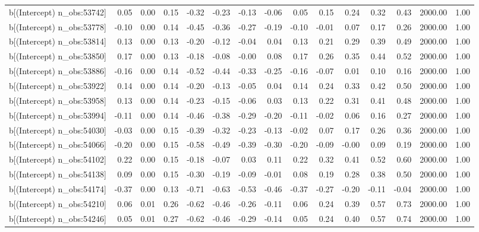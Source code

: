 \begin{table}[ht]
\begin{tabular}{rrrrrrrrrrrrrrr}
  b[(Intercept) n\_obs:53742] & 0.05 & 0.00 & 0.15 & -0.32 & -0.23 & -0.13 & -0.06 & 0.05 & 0.15 & 0.24 & 0.32 & 0.43 & 2000.00 & 1.00 \\ 
  b[(Intercept) n\_obs:53778] & -0.10 & 0.00 & 0.14 & -0.45 & -0.36 & -0.27 & -0.19 & -0.10 & -0.01 & 0.07 & 0.17 & 0.26 & 2000.00 & 1.00 \\ 
  b[(Intercept) n\_obs:53814] & 0.13 & 0.00 & 0.13 & -0.20 & -0.12 & -0.04 & 0.04 & 0.13 & 0.21 & 0.29 & 0.39 & 0.49 & 2000.00 & 1.00 \\ 
  b[(Intercept) n\_obs:53850] & 0.17 & 0.00 & 0.13 & -0.18 & -0.08 & -0.00 & 0.08 & 0.17 & 0.26 & 0.35 & 0.44 & 0.52 & 2000.00 & 1.00 \\ 
  b[(Intercept) n\_obs:53886] & -0.16 & 0.00 & 0.14 & -0.52 & -0.44 & -0.33 & -0.25 & -0.16 & -0.07 & 0.01 & 0.10 & 0.16 & 2000.00 & 1.00 \\ 
  b[(Intercept) n\_obs:53922] & 0.14 & 0.00 & 0.14 & -0.20 & -0.13 & -0.05 & 0.04 & 0.14 & 0.24 & 0.33 & 0.42 & 0.50 & 2000.00 & 1.00 \\ 
  b[(Intercept) n\_obs:53958] & 0.13 & 0.00 & 0.14 & -0.23 & -0.15 & -0.06 & 0.03 & 0.13 & 0.22 & 0.31 & 0.41 & 0.48 & 2000.00 & 1.00 \\ 
  b[(Intercept) n\_obs:53994] & -0.11 & 0.00 & 0.14 & -0.46 & -0.38 & -0.29 & -0.20 & -0.11 & -0.02 & 0.06 & 0.16 & 0.27 & 2000.00 & 1.00 \\ 
  b[(Intercept) n\_obs:54030] & -0.03 & 0.00 & 0.15 & -0.39 & -0.32 & -0.23 & -0.13 & -0.02 & 0.07 & 0.17 & 0.26 & 0.36 & 2000.00 & 1.00 \\ 
  b[(Intercept) n\_obs:54066] & -0.20 & 0.00 & 0.15 & -0.58 & -0.49 & -0.39 & -0.30 & -0.20 & -0.09 & -0.00 & 0.09 & 0.19 & 2000.00 & 1.00 \\ 
  b[(Intercept) n\_obs:54102] & 0.22 & 0.00 & 0.15 & -0.18 & -0.07 & 0.03 & 0.11 & 0.22 & 0.32 & 0.41 & 0.52 & 0.60 & 2000.00 & 1.00 \\ 
  b[(Intercept) n\_obs:54138] & 0.09 & 0.00 & 0.15 & -0.30 & -0.19 & -0.09 & -0.01 & 0.08 & 0.19 & 0.28 & 0.38 & 0.50 & 2000.00 & 1.00 \\ 
  b[(Intercept) n\_obs:54174] & -0.37 & 0.00 & 0.13 & -0.71 & -0.63 & -0.53 & -0.46 & -0.37 & -0.27 & -0.20 & -0.11 & -0.04 & 2000.00 & 1.00 \\ 
  b[(Intercept) n\_obs:54210] & 0.06 & 0.01 & 0.26 & -0.62 & -0.46 & -0.26 & -0.11 & 0.06 & 0.24 & 0.39 & 0.57 & 0.73 & 2000.00 & 1.00 \\ 
  b[(Intercept) n\_obs:54246] & 0.05 & 0.01 & 0.27 & -0.62 & -0.46 & -0.29 & -0.14 & 0.05 & 0.24 & 0.40 & 0.57 & 0.74 & 2000.00 & 1.00 \\ 

\end{tabular}
\end{table}
